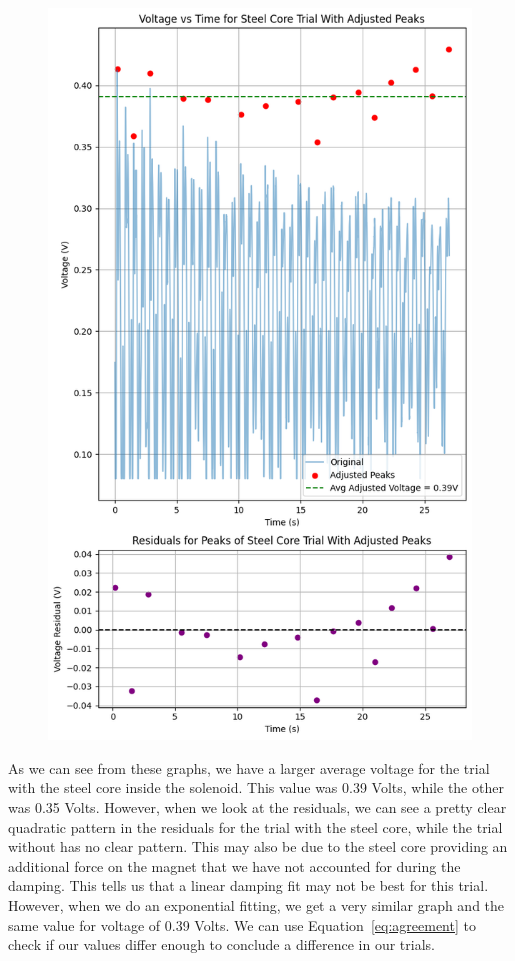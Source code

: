 \documentclass[11pt]{article}
\begin{document}
    \begin{figure}[H]
        \centering
        \includegraphics[width=0.8\linewidth]{resources/images/part3 peaks2}
    \end{figure}

    As we can see from these graphs, we have a larger average voltage for the trial with the steel core inside the solenoid. This value was 0.39 Volts, while the other was 0.35 Volts. However, when we look at the residuals, we can see a pretty clear quadratic pattern in the residuals for the trial with the steel core, while the trial without has no clear pattern. This may also be due to the steel core providing an additional force on the magnet that we have not accounted for during the damping. This tells us that a linear damping fit may not be best for this trial. However, when we do an exponential fitting, we get a very similar graph and the same value for voltage of 0.39 Volts. We can use Equation~\ref{eq:agreement} to check if our values differ enough to conclude a difference in our trials.
\end{document}
